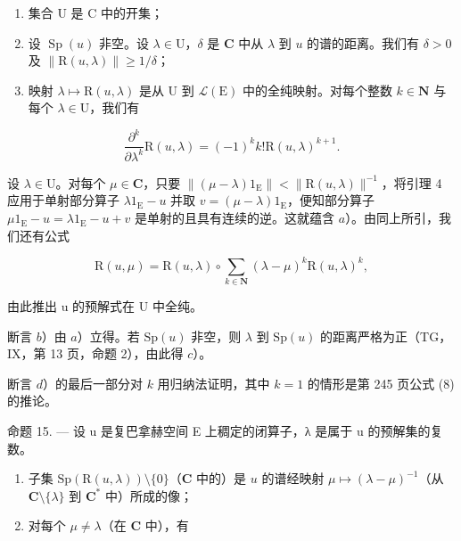 \begin{enumerate}
\def\labelenumi{\alph{enumi})}
\setcounter{enumi}{1}
\item
  集合 U 是 C 中的开集；
\item
  设 \(\operatorname{Sp}(u)\) 非空。设 \(\lambda \in \mathrm{U}\)，\(\delta\) 是 \(\mathbf{C}\) 中从 \(\lambda\) 到 \(u\) 的谱的距离。我们有 \(\delta > 0\) 及 \(\| \mathrm{R}(u, \lambda) \| \geqslant 1 / \delta\)；
\item
  映射 \(\lambda \mapsto \mathrm{R}(u,\lambda)\) 是从 U 到 \(\mathcal{L}(\mathrm{E})\) 中的全纯映射。对每个整数 \(k\in \mathbf{N}\) 与每个 \(\lambda \in \mathrm{U}\)，我们有
\end{enumerate}

\[
\frac {\partial^ {k}}{\partial \lambda^ {k}} \mathrm{R} (u, \lambda) = (- 1) ^ {k} k! \mathrm{R} (u, \lambda) ^ {k + 1}.
\]

设 \(\lambda \in \mathrm{U}\)。对每个 \(\mu \in \mathbf{C}\)，只要 \(\| (\mu -\lambda)1_{\mathrm{E}}\| < \| \mathrm{R}(u,\lambda)\|^{-1}\)，将引理 4 应用于单射部分算子 \(\lambda 1_{\mathrm{E}} - u\) 并取 \(v = (\mu -\lambda)1_{\mathrm{E}}\)，便知部分算子 \(\mu 1_{\mathrm{E}} - u = \lambda 1_{\mathrm{E}} - u + v\) 是单射的且具有连续的逆。这就蕴含 \(a\)）。由同上所引，我们还有公式

\[
\mathrm{R} (u, \mu) = \mathrm{R} (u, \lambda) \circ \sum_ {k \in \mathbf {N}} (\lambda - \mu) ^ {k} \mathrm{R} (u, \lambda) ^ {k},
\]

由此推出 u 的预解式在 U 中全纯。

断言 \(b\)）由 \(a\)）立得。若 \(\mathrm{Sp}(u)\) 非空，则 \(\lambda\) 到 \(\mathrm{Sp}(u)\) 的距离严格为正（TG，IX，第 13 页，命题 2），由此得 \(c\)）。

断言 \(d\)）的最后一部分对 \(k\) 用归纳法证明，其中 \(k = 1\) 的情形是第 245 页公式 (8) 的推论。

命题 15. --- 设 u 是复巴拿赫空间 E 上稠定的闭算子，λ 是属于 u 的预解集的复数。

\begin{enumerate}
\def\labelenumi{\alph{enumi})}
\item
  子集 \(\mathrm{Sp}(\mathrm{R}(u,\lambda)) \setminus \{0\}\)（\(\mathbf{C}\) 中的）是 \(u\) 的谱经映射 \(\mu \mapsto (\lambda -\mu)^{-1}\)（从 \(\mathbf{C} \setminus \{\lambda \}\) 到 \(\mathbf{C}^*\) 中）所成的像；
\item
  对每个 \(\mu \neq \lambda\)（在 \(\mathbf{C}\) 中），有
\end{enumerate}

